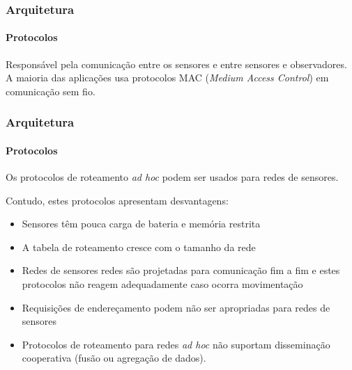 \documentclass[notes]{beamer}
\begin{document}
\begin{frame}
\frametitle{Arquitetura}
\framesubtitle{Protocolos}

\begin{block}

Responsável pela comunicação entre os sensores e entre sensores e observadores. A maioria das aplicações usa protocolos MAC (\textit{Medium Access Control}) em comunicação sem fio. 

\end{block}

\end{frame}

\begin{frame}
\frametitle{Arquitetura}
\framesubtitle{Protocolos}

\begin{block}

Os protocolos de roteamento \textit{ad hoc} podem ser
usados para redes de sensores.

\end{block} \pause

\begin{alertblock}

Contudo, estes protocolos apresentam desvantagens: 

\begin{itemize}

\item Sensores têm pouca carga de bateria e memória restrita \pause

\item A tabela de roteamento cresce com o tamanho da rede \pause

\item Redes de sensores redes são projetadas para comunicação fim a fim e estes protocolos não reagem adequadamente caso ocorra movimentação \pause

\item Requisições de endereçamento podem não ser
apropriadas para redes de sensores \pause

\item Protocolos de roteamento para redes \textit{ad hoc} não suportam disseminação cooperativa (fusão ou agregação de dados). 

\end{itemize}

\end{alertblock}

\end{frame}
\end{document}
